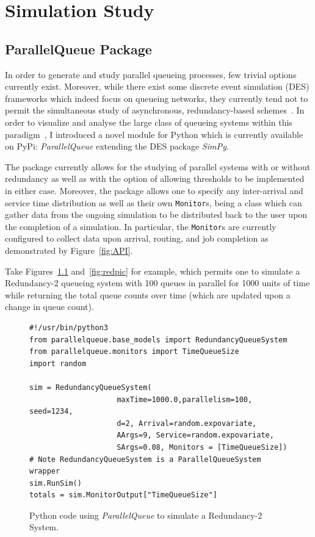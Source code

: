 \chapter{Simulation Study}\label{ch:simulation-study}


\section{ParallelQueue Package}\label{sec:parallelqueue-package}
In order to generate and study parallel queueing processes, few trivial options currently exist.
Moreover, while there exist some discrete event simulation (DES) frameworks which indeed focus on queueing networks, they currently tend not to permit the simultaneous study of asynchronous, redundancy-based schemes~\cite{noauthor_ciwpythonciw_nodate}.
In order to visualize and analyse the large class of queueing systems within this paradigm~\cite{shneer_large-scale_2020,cruise_stability_2020}, I introduced a novel module for Python which is currently available on PyPi: \textit{ParallelQueue} extending the DES package \textit{SimPy}.

The package currently allows for the studying of parallel systems with or without redundancy as well as with the option of allowing thresholds to be implemented in either case.
Moreover, the package allows one to specify any inter-arrival and service time distribution as well as their own \lstinline{Monitor}s, being a class which can gather data from the ongoing simulation to be distributed back to the user upon the completion of a simulation.
In particular, the \lstinline{Monitor}s are currently configured to collect data upon arrival, routing, and job completion as demonstrated by Figure~\ref{fig:API}.

Take Figures~\ref{fig:red} and~\ref{fig:redpic} for example, which permits one to simulate a Redundancy-2 queueing system with 100 queues in parallel for 1000 units of time while returning the total queue counts over time (which are updated upon a change in queue count).

\begin{figure}

    \begin{lstlisting}[label={lst:lstlisting}]
#!/usr/bin/python3
from parallelqueue.base_models import RedundancyQueueSystem
from parallelqueue.monitors import TimeQueueSize
import random

sim = RedundancyQueueSystem(
                    maxTime=1000.0,parallelism=100, seed=1234,
                    d=2, Arrival=random.expovariate,
                    AArgs=9, Service=random.expovariate,
                    SArgs=0.08, Monitors = [TimeQueueSize])
# Note RedundancyQueueSystem is a ParallelQueueSystem wrapper
sim.RunSim()
totals = sim.MonitorOutput["TimeQueueSize"]
    \end{lstlisting}
    \caption{Python code using \textit{ParallelQueue} to simulate a Redundancy-2 System.}
    \label{fig:red}
\end{figure}

